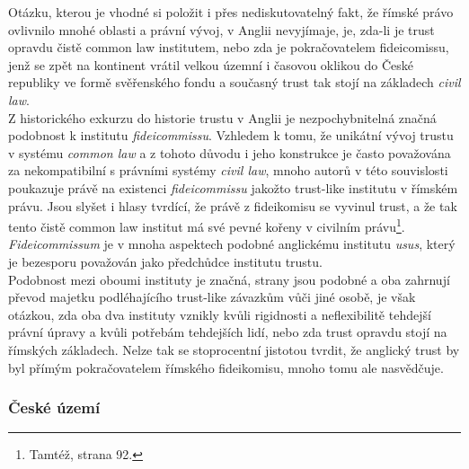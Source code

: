 \documentclass{article}
\begin{document}
Otázku, kterou je vhodné si položit i přes nediskutovatelný fakt, že římské právo ovlivnilo mnohé oblasti a právní vývoj, v Anglii nevyjímaje, je, zda-li je trust opravdu čistě common law institutem, nebo zda je pokračovatelem fideicomissu, jenž se zpět na kontinent vrátil velkou územní i časovou oklikou do České republiky ve formě svěřenského fondu a současný trust tak stojí na základech \textit{civil law}.\\

Z historického exkurzu do historie trustu v Anglii je nezpochybnitelná značná podobnost k institutu \textit{fideicommissu}. Vzhledem k tomu, že unikátní vývoj trustu v systému \textit{common law} a z tohoto důvodu i jeho konstrukce je často považována za nekompatibilní s právními systémy \textit{civil law}, mnoho autorů v této souvislosti poukazuje právě na existenci \textit{fideicommissu} jakožto trust-like institutu v římském právu. Jsou slyšet i hlasy tvrdící, že právě z fideikomisu se vyvinul trust, a že tak tento čistě common law institut má své pevné kořeny v civilním právu\footnote{Tamtéž, strana 92.}. \textit{Fideicommissum} je v mnoha aspektech podobné anglickému institutu \textit{usus}, který je bezesporu považován jako předchůdce institutu trustu.\\

Podobnost mezi oboumi instituty je značná, strany jsou podobné a oba zahrnují převod majetku podléhajícího trust-like závazkům vůči jiné osobě, je však otázkou, zda oba dva instituty vznikly kvůli rigidnosti a neflexibilitě tehdejší právní úpravy a kvůli potřebám tehdejších lidí, nebo zda trust opravdu stojí na římských základech. Nelze tak se stoprocentní jistotou tvrdit, že anglický trust by byl přímým pokračovatelem římského fideikomisu, mnoho tomu ale nasvědčuje.


\subsubsection{České území}
\end{document}
